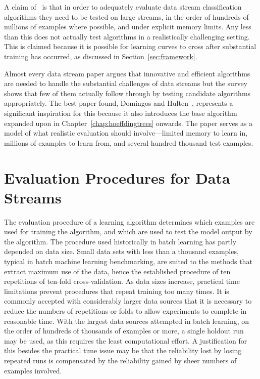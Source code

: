 A claim of~\cite{Kirkby-PhD} %
is that in order to adequately evaluate data stream classification algorithms they need to be tested on large streams, in the order of hundreds of millions of examples where possible, and under explicit memory limits. Any less than this does not actually test algorithms in a realistically challenging setting.
This is claimed because it is possible for learning curves to cross after substantial training has occurred, as discussed in Section~\ref{sec:framework}. %

Almost every data stream paper argues that innovative and efficient algorithms are needed to handle the substantial challenges of data streams but the survey shows that few of them actually follow through by testing candidate algorithms appropriately. The best paper found, Domingos and Hulten~\cite{vfdt}, represents a significant inspiration for this \thesis because it also introduces the base algorithm expanded upon in Chapter~\ref{chap:hoeffdingtrees} onwards. The paper serves as a model of what realistic evaluation should involve---limited memory to learn in, millions of examples to learn from, and several hundred thousand test examples.


\section{Evaluation Procedures for Data Streams}
\label{sec:evalcomp}

The evaluation procedure of a learning algorithm determines which examples are used for training the algorithm, and which are used to test the model output by the algorithm. The procedure used historically in batch learning has partly depended on data size. Small data sets with less than a thousand examples, typical in batch machine learning benchmarking, are suited to the methods that extract maximum use of the data, hence the established procedure of ten repetitions of ten-fold cross-validation. As data sizes increase, practical time limitations prevent procedures that repeat training too many times. It is commonly accepted with considerably larger data sources that it is necessary to reduce the numbers of repetitions or folds to allow experiments to complete in reasonable time. With the largest data sources attempted in batch learning, on the order of hundreds of thousands of examples or more, a single holdout run may be used, as this requires the least computational effort. A justification for this besides the practical time issue may be that the reliability lost by losing repeated runs is compensated by the reliability gained by sheer numbers of examples involved.


